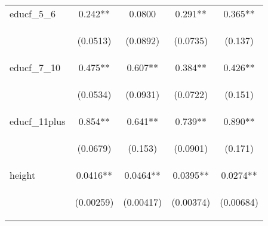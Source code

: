 \documentclass[]{article}
\begin{document}
\begin{center}
\begin{tabular}{lcccc}
educf\_5\_6 & 0.242** & 0.0800 & 0.291** & 0.365** \\
\vspace{4pt} & \begin{footnotesize}(0.0513)\end{footnotesize} & \begin{footnotesize}(0.0892)\end{footnotesize} & \begin{footnotesize}(0.0735)\end{footnotesize} & \begin{footnotesize}(0.137)\end{footnotesize} \\
educf\_7\_10 & 0.475** & 0.607** & 0.384** & 0.426** \\
\vspace{4pt} & \begin{footnotesize}(0.0534)\end{footnotesize} & \begin{footnotesize}(0.0931)\end{footnotesize} & \begin{footnotesize}(0.0722)\end{footnotesize} & \begin{footnotesize}(0.151)\end{footnotesize} \\
educf\_11plus & 0.854** & 0.641** & 0.739** & 0.890** \\
\vspace{4pt} & \begin{footnotesize}(0.0679)\end{footnotesize} & \begin{footnotesize}(0.153)\end{footnotesize} & \begin{footnotesize}(0.0901)\end{footnotesize} & \begin{footnotesize}(0.171)\end{footnotesize} \\
height & 0.0416** & 0.0464** & 0.0395** & 0.0274** \\
\vspace{4pt} & \begin{footnotesize}(0.00259)\end{footnotesize} & \begin{footnotesize}(0.00417)\end{footnotesize} & \begin{footnotesize}(0.00374)\end{footnotesize} & \begin{footnotesize}(0.00684)\end{footnotesize} \\

\end{tabular}
\end{center}
\end{document}
